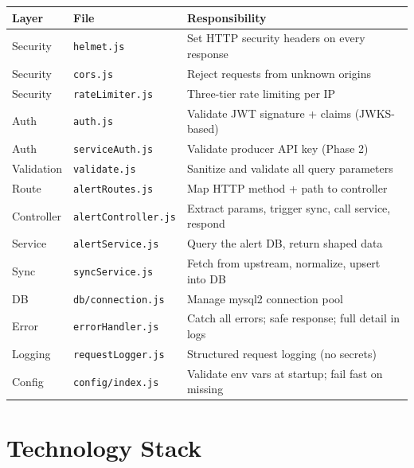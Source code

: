 \documentclass[11pt]{article}
\begin{document}
\begin{table}[h]
\small
\begin{tabularx}{\textwidth}{l l X}
\toprule
\textbf{Layer} & \textbf{File} & \textbf{Responsibility} \\
\midrule
Security & \texttt{helmet.js} & Set HTTP security headers on every response \\
Security & \texttt{cors.js} & Reject requests from unknown origins \\
Security & \texttt{rateLimiter.js} & Three-tier rate limiting per IP \\
Auth & \texttt{auth.js} & Validate JWT signature + claims (JWKS-based) \\
Auth & \texttt{serviceAuth.js} & Validate producer API key (Phase 2) \\
Validation & \texttt{validate.js} & Sanitize and validate all query parameters \\
Route & \texttt{alertRoutes.js} & Map HTTP method + path to controller \\
Controller & \texttt{alertController.js} & Extract params, trigger sync, call service, respond \\
Service & \texttt{alertService.js} & Query the alert DB, return shaped data \\
Sync & \texttt{syncService.js} & Fetch from upstream, normalize, upsert into DB \\
DB & \texttt{db/connection.js} & Manage mysql2 connection pool \\
Error & \texttt{errorHandler.js} & Catch all errors; safe response; full detail in logs \\
Logging & \texttt{requestLogger.js} & Structured request logging (no secrets) \\
Config & \texttt{config/index.js} & Validate env vars at startup; fail fast on missing \\
\bottomrule
\end{tabularx}
\end{table}

\section{Technology Stack}
\end{document}
